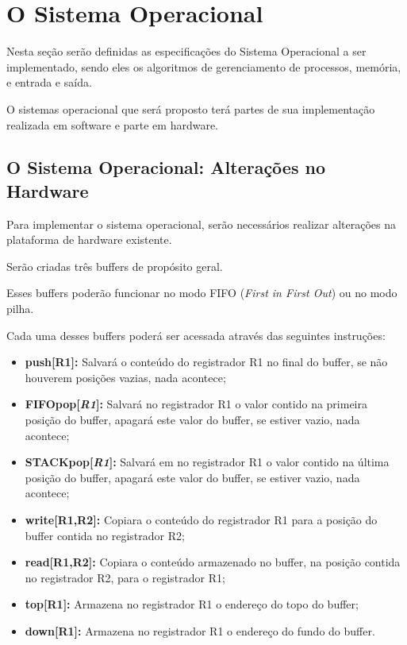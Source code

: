 \section{O Sistema Operacional}

Nesta seção serão definidas as especificações do Sistema Operacional a ser implementado, sendo eles os algoritmos de gerenciamento de processos, memória, e entrada e saída.

O sistemas operacional que será proposto terá partes de sua implementação realizada em software e parte em hardware.

\subsection{O Sistema Operacional: Alterações no Hardware}

Para implementar o sistema operacional, serão necessários realizar alterações na plataforma de hardware existente.

Serão criadas três buffers de propósito geral.

Esses buffers poderão funcionar no modo FIFO (\textit{First in First Out}) ou no modo pilha.

Cada uma desses buffers poderá ser acessada através das seguintes instruções:

\begin{itemize}
	\item \textbf{push[R1]:} Salvará o conteúdo do registrador R1 no final do buffer, se não houverem posições vazias, nada acontece;
	
	\item \textbf{FIFOpop[\textit{R1}]:} Salvará no registrador R1 o valor contido na primeira posição do buffer, apagará este valor do buffer, se estiver vazio, nada acontece;
		
	\item \textbf{STACKpop[\textit{R1}]:} Salvará em no registrador R1 o valor contido na última posição do buffer, apagará este valor do buffer, se estiver vazio, nada acontece;
	
	\item \textbf{write[R1,R2]:} Copiara o conteúdo do registrador R1 para a posição do buffer contida no registrador R2; 
	
	\item \textbf{read[R1,R2]:} Copiara o conteúdo armazenado no buffer, na posição contida no registrador R2, para o registrador R1;
	
	\item \textbf{top[R1]:} Armazena no registrador R1 o endereço do topo do buffer;

	\item \textbf{down[R1]:} Armazena no registrador R1 o endereço do fundo do buffer.
\end{itemize}

